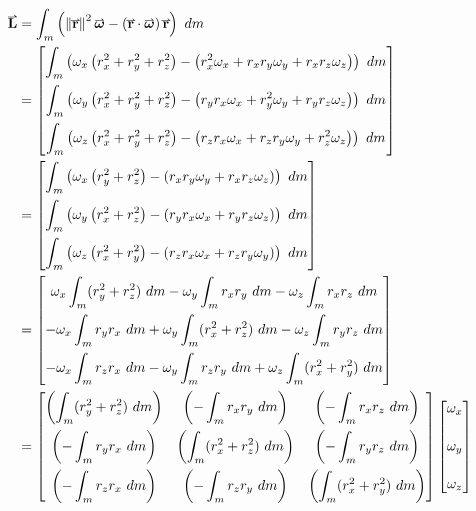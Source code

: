 \documentclass[main.tex]{subfiles}
\begin{document}
                    
                    \begin{align*}
                        \vect{L} &= \int_m \left(\vmod{\vect{r}}^2\vect{\omega} - \left(\vect{r}\cdot\vect{\omega}\right)\vect{r} \right)\ud m\\
                        &= \Matrix{{\bint_m \left(\omega_x \left(r_x^2 + r_y^2 + r_z^2 \right) - \left(r_x^2 \omega_x + r_x r_y \omega_y + r_x r_z \omega_z\right)\right) \ud m}\\[1em]
                        {\bint_m \left(\omega_y \left(r_x^2 + r_y^2 + r_z^2 \right) - \left(r_y r_x \omega_x + r_y^2 \omega_y + r_y r_z \omega_z\right)\right) \ud m}\\[1em]
                        {\bint_m \left(\omega_z \left(r_x^2 + r_y^2 + r_z^2 \right) - \left(r_z r_x \omega_x + r_z r_y \omega_y + r_z^2 \omega_z\right)\right) \ud m}}\\
                        &= \Matrix{{\bint_m \left(\omega_x \left(r_y^2 + r_z^2 \right) - \left(r_x r_y \omega_y + r_x r_z \omega_z\right)\right) \ud m}\\[1em]
                        {\bint_m \left(\omega_y \left(r_x^2 + r_z^2 \right) - \left(r_y r_x \omega_x + r_y r_z \omega_z\right)\right) \ud m}\\[1em]
                        {\bint_m \left(\omega_z \left(r_x^2 + r_y^2\right) - \left(r_z r_x \omega_x + r_z r_y \omega_y\right)\right) \ud m}}\\
                        &= \Matrix{\omega_x \bint_m (r_y^2 + r_z^2) \ud m - \omega_y \bint_m r_x r_y \ud m - \omega_z \bint_m r_x r_z \ud m\\[1em]
                        -\omega_x \bint_m r_y r_x \ud m + \omega_y \bint_m (r_x^2 + r_z^2) \ud m - \omega_z \bint_m r_y r_z \ud m\\[1em]
                        -\omega_x \bint_m r_z r_x \ud m - \omega_y \bint_m r_z r_y \ud m + \omega_z \bint_m (r_x^2 + r_y^2) \ud m}\\
                        &= \Matrix{\left(\bint_m (r_y^2 + r_z^2) \ud m\right)& \left(-\bint_m r_x r_y \ud m\right) & \left(-\bint_m r_x r_z \ud m\right)\\[1em]
                        \left(-\bint_m r_y r_x \ud m\right) & \left(\bint_m (r_x^2 + r_z^2) \ud m\right) & \left(-\bint_m r_y r_z \ud m\right)\\[1em]
                        \left(-\bint_m r_z r_x \ud m\right) & \left(-\bint_m r_z r_y \ud m\right) & \left(\bint_m (r_x^2 + r_y^2) \ud m\right)} \Matrix{\omega_x\\[1.5em]
                        \omega_y\\[1.5em]
                        \omega_z}
                    \end{align*}
\end{document}
